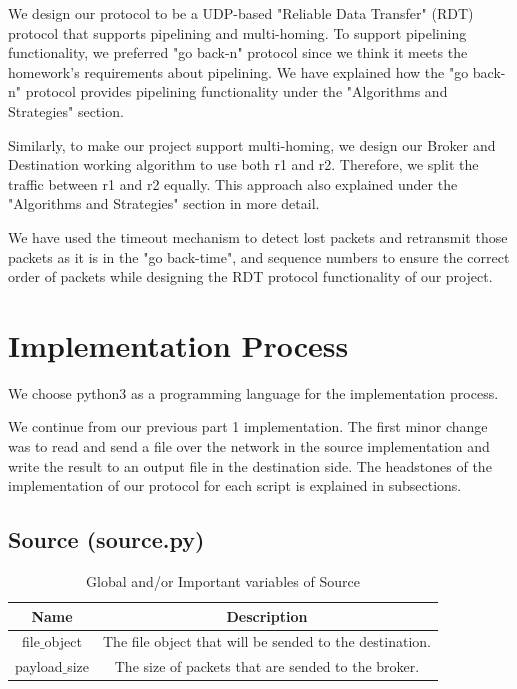 \documentclass[conference]{IEEEtran}
\begin{document}
We design our protocol to be a UDP-based "Reliable Data Transfer" (RDT) protocol that supports pipelining and multi-homing. To support pipelining functionality, we preferred  "go back-n" protocol since we think it meets the homework's requirements about pipelining. We have explained how the "go back-n" protocol provides pipelining functionality under the "Algorithms and Strategies" section.

Similarly, to make our project support multi-homing, we design our Broker and Destination working algorithm to use both r1 and r2. Therefore, we split the traffic between r1 and r2 equally. This approach also explained under the "Algorithms and Strategies" section in more detail.

We have used the timeout mechanism to detect lost packets and retransmit those packets as it is in the "go back-time", and sequence numbers to ensure the correct order of packets while designing the RDT protocol functionality of our project. 

\section{Implementation Process}
We choose python3 as a programming language for the implementation process.

We continue from our previous part 1 implementation. The first minor change was to read and send a file over the network in the source implementation and write the result to an output file in the destination side. The headstones of the implementation of our protocol for each script is explained in subsections.

\subsection{Source (source.py)}

\begin{table}[h]
\renewcommand{\arraystretch}{1.3}
\caption{Global and/or Important variables of Source}
\label{tab:example}
\centering
\begin{tabular}{c|c}
    \hline
    Name &  Description\\
    \hline
    \hline

    file$\_$object   &   The file object that will be sended to the destination.\\
    \hline

    payload$\_$size    &   The size of packets that are sended to the broker.\\
    \hline
\end{tabular}
\end{table}
\end{document}
